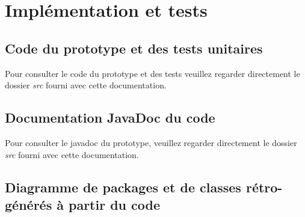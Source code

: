 \documentclass[10pt,a4paper]{book}
\begin{document}
\chapter{Implémentation et tests}
\section{Code du prototype et des tests unitaires}
Pour consulter le code du prototype et des tests veuillez regarder directement le dossier \textit{src} fourni avec cette documentation.
\section{Documentation JavaDoc du code}
Pour consulter le javadoc du prototype, veuillez regarder directement le dossier \textit{src} fourni avec cette documentation.
\section{Diagramme de packages et de classes rétro-générés à partir du code}
\end{document}
